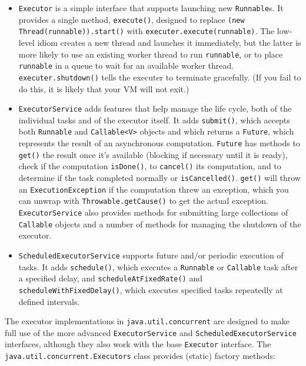 \documentclass[table, xcdraw]{article}%
\begin{document}
\begin{itemize}
    \item \texttt{Executor} is a simple interface that supports launching new \texttt{Runnable}s. It provides a single method, \texttt{execute()}, designed to replace \texttt{(new Thread(runnable)).start()} with \texttt{executer.execute(runnable)}. The low-level idiom creates a new thread and launches it immediately, but the latter is more likely to use an existing worker thread to run \texttt{runnable}, or to place \texttt{runnable} in a queue to wait for an available worker thread. \texttt{executer.shutdown()} tells the executer to terminate gracefully. (If you fail to do this, it is likely that your VM will not exit.)
    \item \texttt{ExecutorService} adds features that help manage the life cycle, both of the individual tasks and of the executor itself. It adds \texttt{submit()}, which accepts both \texttt{Runnable} and \texttt{Callable<V>} objects and which returns a \texttt{Future}, which represents the result of an asynchronous computation. \texttt{Future} has methods to \texttt{get()} the result once it's available (blocking if necessary until it is ready), check if the computation \texttt{isDone()}, to \texttt{cancel()} its computation, and to determine if the task completed normally or \texttt{isCancelled()}. \texttt{get()} will throw an \texttt{ExecutionException} if the computation threw an exception, which you can unwrap with \texttt{Throwable.getCause()} to get the actual exception. \texttt{ExecutorService} also provides methods for submitting large collections of \texttt{Callable} objects and a number of methods for managing the shutdown of the executor.
    \item \texttt{ScheduledExecutorService} supports future and/or periodic execution of tasks. It adds \texttt{schedule()}, which executes a \texttt{Runnable} or \texttt{Callable} task after a specified delay, and \texttt{scheduleAtFixedRate()} and \texttt{scheduleWithFixedDelay()}, which executes specified tasks repeatedly at defined intervals.
\end{itemize}

The executor implementations in \texttt{java.util.concurrent} are designed to make full use of the more advanced \texttt{ExecutorService} and \texttt{ScheduledExecutorService} interfaces, although they also work with the base \texttt{Executor} interface. The \texttt{java.util.concurrent.Executors} class provides (static) factory methods:
\end{document}
